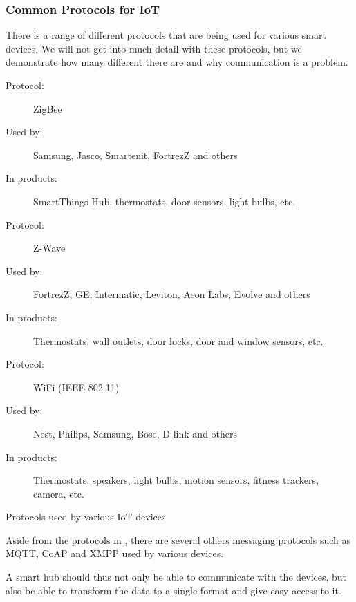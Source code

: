 \subsubsection{Common Protocols for IoT}
There is a range of different protocols that are being used for various smart devices. 
We will not get into much detail with these protocols, 
but we demonstrate how many different there are and why communication is a problem.
\begin{table}
   \begin{description}
       \item[Protocol:] ZigBee
       \item[Used by:] Samsung, Jasco, Smartenit, FortrezZ and others
       \item[In products:] SmartThings Hub, thermostats, door sensors, light bulbs, etc.\\
       
       \item[Protocol:] Z-Wave
       \item[Used by:] FortrezZ, GE, Intermatic, Leviton, Aeon Labs, Evolve and others
       \item[In products:] Thermostats, wall outlets, door locks, door and window sensors, etc.  \\
       
       \item[Protocol:] WiFi (IEEE 802.11)
       \item[Used by:] Nest, Philips, Samsung, Bose, D-link and others
       \item[In products:] Thermostats, speakers, light bulbs, motion sensors, fitness trackers, camera, etc. 
    \end{description}
    \caption{Protocols used by various IoT devices}\label{table:iotprotocols}
\end{table}

Aside from the protocols in , 
there are several others messaging protocols such as MQTT, CoAP and XMPP used by various devices. 

A smart hub should thus not only be able to communicate with the devices, 
but also be able to transform the data to a single format and give easy access to it. 

